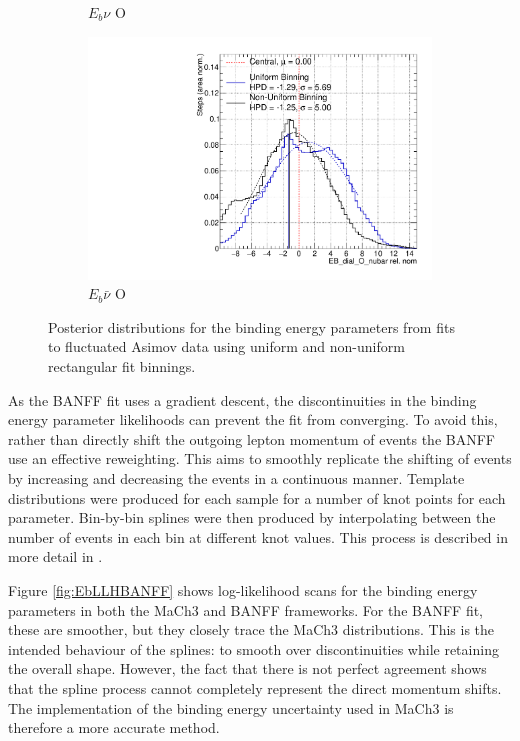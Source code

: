 \begin{figure}
\begin{subfigure}{.48\textwidth}
  \caption{$E_{b}\nu$ O}
\end{subfigure}
\begin{subfigure}{.48\textwidth}
  \centering
  \includegraphics[width=0.73\linewidth]{figs/EB_dial_O_nubarFluc2}
  \caption{$E_{b}\bar{\nu}$ O}
\end{subfigure}
\caption{Posterior distributions for the binding energy parameters from fits to fluctuated Asimov data using uniform and non-uniform rectangular fit binnings.}
\label{fig:Ebfluc}
\end{figure}

As the BANFF fit uses a gradient descent, the discontinuities in the binding energy parameter likelihoods can prevent the fit from converging. To avoid this, rather than directly shift the outgoing lepton momentum of events the BANFF use an effective reweighting. This aims to smoothly replicate the shifting of events by increasing and decreasing the events in a continuous manner. Template distributions were produced for each sample for a number of knot points for each parameter. Bin-by-bin splines were then produced by interpolating between the number of events in each bin at different knot values. This process is described in more detail in \cite{tn395}. 

Figure \ref{fig:EbLLHBANFF} shows log-likelihood scans for the binding energy parameters in both the MaCh3 and BANFF frameworks. For the BANFF fit, these are smoother, but they closely trace the MaCh3 distributions. This is the intended behaviour of the splines: to smooth over discontinuities while retaining the overall shape. However, the fact that there is not perfect agreement shows that the spline process cannot completely represent the direct momentum shifts. The implementation of the binding energy uncertainty used in MaCh3 is therefore a more accurate method.

